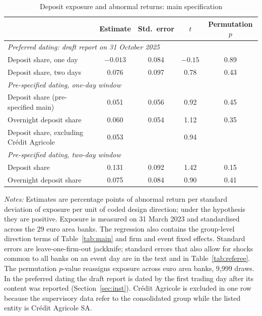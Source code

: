 \documentclass[11pt]{article}
\theoremstyle{plain}\newtheorem{proposition}{Proposition}
\begin{document}
\begin{table}[t]\centering\small
\begin{threeparttable}
\caption{Deposit exposure and abnormal returns: main specification}\label{tab:cont}
\begin{tabular}{lcccc}
\toprule
& Estimate & Std.\ error & $t$ & Permutation $p$ \\
\midrule
\multicolumn{5}{l}{\textit{Preferred dating: draft report on 31 October 2025}} \\
Deposit share, one day & $-0.013$ & 0.084 & $-0.15$ & 0.89 \\
Deposit share, two days & 0.076 & 0.097 & 0.78 & 0.43 \\[3pt]
\multicolumn{5}{l}{\textit{Pre-specified dating, one-day window}} \\
Deposit share (pre-specified main) & 0.051 & 0.056 & 0.92 & 0.45 \\
Overnight deposit share & 0.060 & 0.054 & 1.12 & 0.35 \\
Deposit share, excluding Crédit Agricole & 0.053 & & 0.94 & \\[3pt]
\multicolumn{5}{l}{\textit{Pre-specified dating, two-day window}} \\
Deposit share & 0.131 & 0.092 & 1.42 & 0.15 \\
Overnight deposit share & 0.075 & 0.084 & 0.90 & 0.41 \\
\bottomrule
\end{tabular}
\begin{tablenotes}\footnotesize
\item \textit{Notes:} Estimates are percentage points of abnormal return per standard deviation of exposure per unit of coded design direction; under the hypothesis they are positive. Exposure is measured on 31 March 2023 and standardised across the 29 euro area banks. The regression also contains the group-level direction terms of Table~\ref{tab:main} and firm and event fixed effects. Standard errors are leave-one-firm-out jackknife; standard errors that also allow for shocks common to all banks on an event day are in the text and in Table~\ref{tab:referee}. The permutation $p$-value reassigns exposure across euro area banks, 9,999 draws. In the preferred dating the draft report is dated by the first trading day after its content was reported (Section~\ref{sec:inst}). Crédit Agricole is excluded in one row because the supervisory data refer to the consolidated group while the listed entity is Crédit Agricole SA.
\end{tablenotes}
\end{threeparttable}
\end{table}
\end{document}
